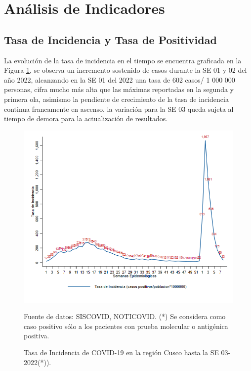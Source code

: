 \documentclass[12pt,a4paper,openany]{book}
\begin{document}

\clearpage

    \section*{Análisis de Indicadores}
   	\subsection*{Tasa de Incidencia y Tasa de Positividad}
\noindent La evolución de la tasa de incidencia en el tiempo se encuentra graficada en la Figura \ref{fig:incidencia}, se observa un incremento sostenido de casos durante la SE 01 y 02 del año 2022, alcanzando en la SE 01 del 2022 una tasa de 602 casos/ 1 000 000 personas, cifra mucho más alta que las máximas reportadas en la segunda y primera ola, asimismo la pendiente de crecimiento de la tasa de incidencia continua francamente en ascenso, la variación para la SE 03 queda sujeta al tiempo de demora para la actualización de resultados. 

  \begin{figure}[h]
  	\caption{Tasa de Incidencia de COVID-19 en la región Cusco hasta la SE 03-2022(*)). }\label{fig:incidencia}
  	\begin{center}
  		\includegraphics[width=0.80\linewidth]{../figuras/tasa_incidencia_2021_2022.png}
  	\end{center}
  	{\footnotesize {Fuente de datos: SISCOVID, NOTICOVID. (*) Se considera como caso positivo sólo a los pacientes con prueba molecular o antigénica positiva.}}
  \end{figure}
   
\end{document}
